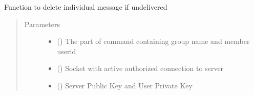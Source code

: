 \documentclass[letterpaper,10pt,english]{sphinxmanual}
\begin{document}
\begin{fulllineitems}
\label{\detokenize{userInputHandler:userInputHandler.deleteMessageIfUndelivered}}
Function to delete individual message if undelivered
\begin{quote}\begin{description}
\item[{Parameters}] \leavevmode\begin{itemize}
\item {} 
 () \textendash{} The part of command containing group name and member userid

\item {} 
 () \textendash{} Socket with active authorized connection to server

\item {} 
 () \textendash{} Server Public Key and User Private Key

\end{itemize}

\end{description}\end{quote}

\end{fulllineitems}

\end{document}
